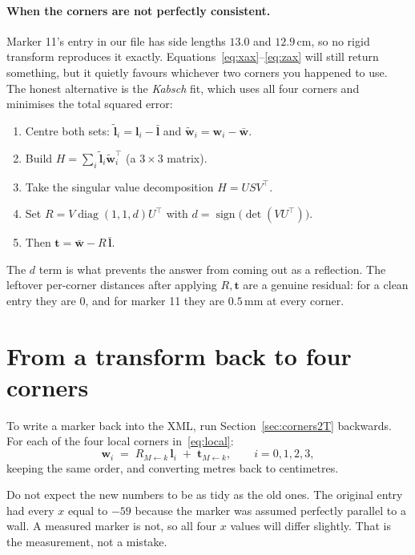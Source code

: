 \documentclass[11pt,a4paper]{article}
\newcommand{\R}[2]{R_{#1 \leftarrow #2}}
\newcommand{\vt}[1]{\mathbf{#1}}
\begin{document}
\paragraph{When the corners are not perfectly consistent.} Marker 11's entry in our file
has side lengths $13.0$ and $12.9$\,cm, so no rigid transform reproduces it exactly.
Equations~\eqref{eq:xax}--\eqref{eq:zax} will still return something, but it quietly
favours whichever two corners you happened to use. The honest alternative is the
\emph{Kabsch} fit, which uses all four corners and minimises the total squared error:

\begin{enumerate}[leftmargin=*,itemsep=1pt]
\item Centre both sets: $\tilde{\vt{l}}_i = \vt{l}_i - \bar{\vt{l}}$ and
      $\tilde{\vt{w}}_i = \vt{w}_i - \bar{\vt{w}}$.
\item Build $H = \sum_i \tilde{\vt{l}}_i \tilde{\vt{w}}_i^{\!\top}$ (a $3\times3$ matrix).
\item Take the singular value decomposition $H = U S V^{\!\top}$.
\item Set $R = V \operatorname{diag}(1,1,d) U^{\!\top}$ with
      $d = \operatorname{sign}\bigl(\det(V U^{\!\top})\bigr)$.
\item Then $\vt{t} = \bar{\vt{w}} - R\,\bar{\vt{l}}$.
\end{enumerate}
The $d$ term is what prevents the answer from coming out as a reflection. The leftover
per-corner distances after applying $R,\vt{t}$ are a genuine residual: for a clean entry
they are $0$, and for marker 11 they are $0.5$\,mm at every corner.

\section{From a transform back to four corners}

To write a marker back into the XML, run Section~\ref{sec:corners2T} backwards. For each
of the four local corners in~\eqref{eq:local}:
\begin{equation}
  \vt{w}_i \;=\; \R{M}{k}\,\vt{l}_i \;+\; \vt{t}_{M \leftarrow k},
  \qquad i = 0,1,2,3,
  \label{eq:back}
\end{equation}
keeping the same order, and converting metres back to centimetres.

Do not expect the new numbers to be as tidy as the old ones. The original entry had
every $x$ equal to $-59$ because the marker was assumed perfectly parallel to a wall.
A measured marker is not, so all four $x$ values will differ slightly. That is the
measurement, not a mistake.
\end{document}
